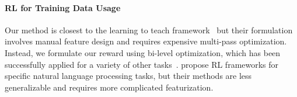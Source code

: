  \paragraph{RL for Training Data Usage} Our method is closest to the learning to teach framework~\citep{learn_to_teach} but their formulation involves manual feature design and requires expensive multi-pass optimization. Instead, we formulate our reward using bi-level optimization, which has been successfully applied for a variety of other tasks~\citep{bilevel_optim,hier_optim,darts,hyper_grad,learn_reweight}. \citep{reinforce_cotrain,rl_nmt,learn_active_learn} propose RL frameworks for specific natural language processing tasks, but their methods are less generalizable and requires more complicated featurization.












